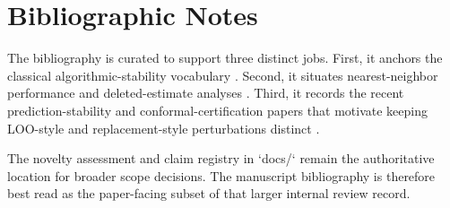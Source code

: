 \section{Bibliographic Notes}

The bibliography is curated to support three distinct jobs. First, it anchors
the classical algorithmic-stability vocabulary
\cite{bousquet2002stability,kutin2002almost,feldman2019high,bousquet2020sharpening}.
Second, it situates nearest-neighbor performance and deleted-estimate analyses
\cite{cover1967nearest,cover1968estimation,stone1977consistent,rogers1978finite,devroye1979distribution,devroye1979local}.
Third, it records the recent prediction-stability and conformal-certification
papers that motivate keeping LOO-style and replacement-style perturbations
distinct \cite{ndiaye2022stability,liang2023learning,pournaderi2024training,lee2025framework}.

The novelty assessment and claim registry in `docs/` remain the authoritative
location for broader scope decisions. The manuscript bibliography is therefore
best read as the paper-facing subset of that larger internal review record.
